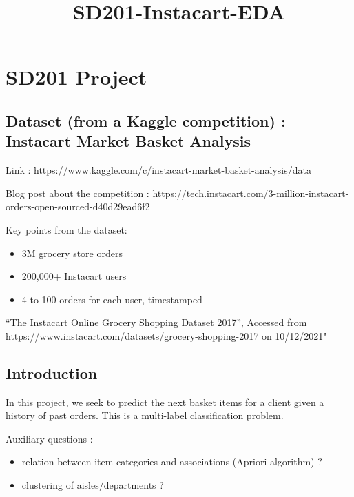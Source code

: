 \documentclass[11pt]{article}
\title{SD201-Instacart-EDA}
\providecommand{\tightlist}{%
      \setlength{\itemsep}{0pt}\setlength{\parskip}{0pt}}
\begin{document}
    
    \maketitle
    
    

    
    \hypertarget{sd201-project}{%
\section{SD201 Project}\label{sd201-project}}

    \hypertarget{dataset-from-a-kaggle-competition-instacart-market-basket-analysis}{%
\subsection{Dataset (from a Kaggle competition) : Instacart Market
Basket
Analysis}\label{dataset-from-a-kaggle-competition-instacart-market-basket-analysis}}

Link : https://www.kaggle.com/c/instacart-market-basket-analysis/data

Blog post about the competition :
https://tech.instacart.com/3-million-instacart-orders-open-sourced-d40d29ead6f2

Key points from the dataset:

\begin{itemize}
\tightlist
\item
  3M grocery store orders
\item
  200,000+ Instacart users
\item
  4 to 100 orders for each user, timestamped
\end{itemize}

``The Instacart Online Grocery Shopping Dataset 2017'', Accessed from
https://www.instacart.com/datasets/grocery-shopping-2017 on 10/12/2021"

    \hypertarget{introduction}{%
\subsection{Introduction}\label{introduction}}

    In this project, we seek to predict the next basket items for a client
given a history of past orders. This is a multi-label classification
problem.

Auxiliary questions :

\begin{itemize}
\tightlist
\item
  relation between item categories and associations (Apriori algorithm)
  ?
\item
  clustering of aisles/departments ?
\end{itemize}
\end{document}
